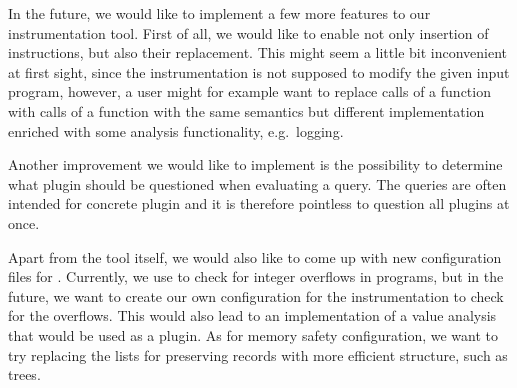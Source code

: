 In the future, we would like to implement a few more features to our
instrumentation tool. First of all, we would like to enable not only insertion
of instructions, but also their replacement. This might seem a little bit
inconvenient at first sight, since the instrumentation is not supposed to
modify the given input program, however, a user might for example want to
replace calls of a function with calls of a function with the same semantics
but different implementation enriched with some analysis functionality, e.g.~logging.

Another improvement we would like to implement is the possibility to determine
what plugin should be questioned when evaluating a query. The queries are often
intended for concrete plugin and it is therefore pointless to question all
plugins at once.

Apart from the tool itself, we would also like to come up with new
configuration files for \symbiotic. Currently, we use \clang to check for
integer overflows in programs, but in the future, we want to create our own
configuration for the instrumentation to check for the overflows. This would
also lead to an implementation of a value analysis that would be used as a plugin.
As for memory safety configuration, we want to try replacing the lists for
preserving records with more efficient structure, such as trees.
